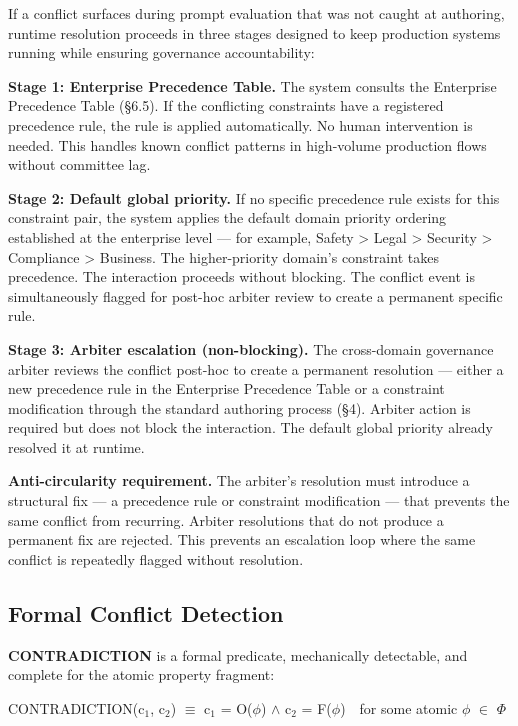 If a conflict surfaces during prompt evaluation that was not caught at authoring, runtime resolution proceeds in three stages designed to keep production systems running while ensuring governance accountability:

\textbf{Stage 1: Enterprise Precedence Table.} The system consults the Enterprise Precedence Table (\S{}6.5). If the conflicting constraints have a registered precedence rule, the rule is applied automatically. No human intervention is needed. This handles known conflict patterns in high-volume production flows without committee lag.

\textbf{Stage 2: Default global priority.} If no specific precedence rule exists for this constraint pair, the system applies the default domain priority ordering established at the enterprise level --- for example, Safety > Legal > Security > Compliance > Business. The higher-priority domain's constraint takes precedence. The interaction proceeds without blocking. The conflict event is simultaneously flagged for post-hoc arbiter review to create a permanent specific rule.

\textbf{Stage 3: Arbiter escalation (non-blocking).} The cross-domain governance arbiter reviews the conflict post-hoc to create a permanent resolution --- either a new precedence rule in the Enterprise Precedence Table or a constraint modification through the standard authoring process (\S{}4). Arbiter action is required but does not block the interaction. The default global priority already resolved it at runtime.

\textbf{Anti-circularity requirement.} The arbiter's resolution must introduce a structural fix --- a precedence rule or constraint modification --- that prevents the same conflict from recurring. Arbiter resolutions that do not produce a permanent fix are rejected. This prevents an escalation loop where the same conflict is repeatedly flagged without resolution.

\subsection{Formal Conflict Detection}


\textbf{CONTRADICTION} is a formal predicate, mechanically detectable, and complete for the atomic property fragment:

\begin{claddisp}
CONTRADICTION(c$_1$, c$_2$) $\equiv$ c$_1$ = O($\phi$) $\wedge$ c$_2$ = F($\phi$)~~for some atomic $\phi$ $\in$ $\Phi$
\end{claddisp}


